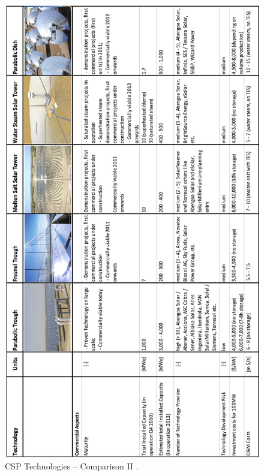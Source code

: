 \documentclass[Master,MEE,english]{twbook}%
\begin{document}
\begin{figure}[h]  
\centering
\includegraphics[height=0.95\textheight]{FIG/CSPOverview2}
\caption[CSP Technologies – Comparison I]{CSP Technologies – Comparison II \cite{Fichtner2010}.}\label{CSPOverview2}
\end{figure}
\pagebreak
%
\newpage
\end{document}
